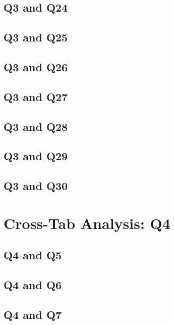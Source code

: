 \documentclass{report}
\begin{document}
\clearpage
\section{Q3 and Q24}


\clearpage
\section{Q3 and Q25}


\clearpage
\section{Q3 and Q26}


\clearpage
\section{Q3 and Q27}


\clearpage
\section{Q3 and Q28}


\clearpage
\section{Q3 and Q29}


\clearpage
\section{Q3 and Q30}


\chapter{Cross-Tab Analysis: Q4}
\section{Q4 and Q5}


\clearpage
\section{Q4 and Q6}


\clearpage
\section{Q4 and Q7}

\end{document}
